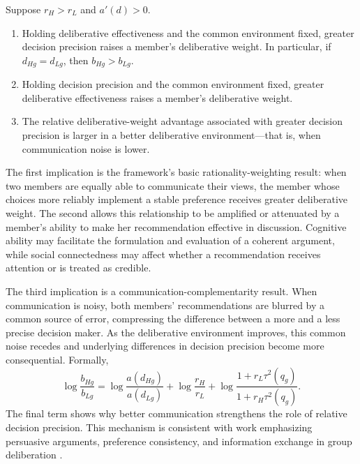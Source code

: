 \documentclass[11 pt]{article}
\begin{document}
\begin{proposition}
\label{prop:deliberation}
Suppose $r_H>r_L$ and $a'(d)>0$.
\begin{enumerate}
    \item Holding deliberative effectiveness and the common environment fixed, greater decision precision raises a member's deliberative weight. In particular, if $d_{Hg}=d_{Lg}$, then $b_{Hg}>b_{Lg}$.
    \item Holding decision precision and the common environment fixed, greater deliberative effectiveness raises a member's deliberative weight.
    \item The relative deliberative-weight advantage associated with greater decision precision is larger in a better deliberative environment---that is, when communication noise is lower.
\end{enumerate}
\end{proposition}

The first implication is the framework's basic rationality-weighting result: when two members are equally able to communicate their views, the member whose choices more reliably implement a stable preference receives greater deliberative weight. The second allows this relationship to be amplified or attenuated by a member's ability to make her recommendation effective in discussion. Cognitive ability may facilitate the formulation and evaluation of a coherent argument, while social connectedness may affect whether a recommendation receives attention or is treated as credible.

The third implication is a communication-complementarity result. When communication is noisy, both members' recommendations are blurred by a common source of error, compressing the difference between a more and a less precise decision maker. As the deliberative environment improves, this common noise recedes and underlying differences in decision precision become more consequential. Formally,
\begin{equation}
    \log\frac{b_{Hg}}{b_{Lg}}=
    \log\frac{a(d_{Hg})}{a(d_{Lg})}+
    \log\frac{r_H}{r_L}+
    \log\frac{1+r_L\tau^2(q_g)}{1+r_H\tau^2(q_g)}.
    \label{eq:log_weight}
\end{equation}
The final term shows why better communication strengthens the role of relative decision precision. This mechanism is consistent with work emphasizing persuasive arguments, preference consistency, and information exchange in group deliberation \citep{burnstein1975what,goeree2011experimental,mojzisch2014consistency}.
\end{document}
